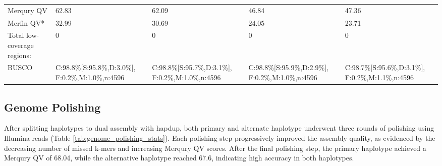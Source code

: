 \documentclass[9pt,twocolumn,twoside,lineno]{gsag3jnl}
\begin{document}
\begin{table}[p]
\begin{tableminipage}{\textwidth}
\begin{tabularx}{\textwidth}{@{}XXXXX@{}}
Merqury QV                            & 62.83                                                 & 62.09                                                 & 46.84                                                 & 47.36                                                 \\
Merfin QV*                            & 32.99                                                 & 30.69                                                 & 24.05                                                 & 23.71                                                 \\
Total low-coverage regions:           & 0                                                     & 0                                                     & 0                                                     & 0                                                     \\
BUSCO                                 & C:98.8\%{[}S:95.8\%,D:3.0\%{]}, F:0.2\%,M:1.0\%,n:4596 & C:98.8\%{[}S:95.7\%,D:3.1\%{]}, F:0.2\%,M:1.0\%,n:4596 & C:98.8\%{[}S:95.9\%,D:2.9\%{]}, F:0.2\%,M:1.0\%,n:4596 & C:98.7\%{[}S:95.6\%,D:3.1\%{]}, F:0.2\%,M:1.1\%,n:4596 \\
\hline
\end{tabularx}
  \label{tab:genome_assemlby_stats}
\end{tableminipage}
\end{table}

\subsection{Genome Polishing}

After splitting haplotypes to dual assembly with hapdup, both primary and alternate haplotype underwent three rounds of polishing using Illumina reads (Table \ref{tab:genome_polishing_stats}). Each polishing step progressively improved the assembly quality, as evidenced by the decreasing number of missed k-mers and increasing Merqury QV scores. After the final polishing step, the primary haplotype achieved a Merqury QV of 68.04, while the alternative haplotype reached 67.6, indicating high accuracy in both haplotypes.
\end{document}

